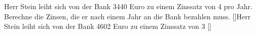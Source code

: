Herr Stein leiht sich von der Bank 3440 Euro zu einem Zinssatz von 4 pro Jahr. Berechne die Zinsen, die er nach einem Jahr an die Bank bezahlen muss.
[]Herr Stein leiht sich von der Bank 4602 Euro zu einem Zinssatz von 3 %
[]